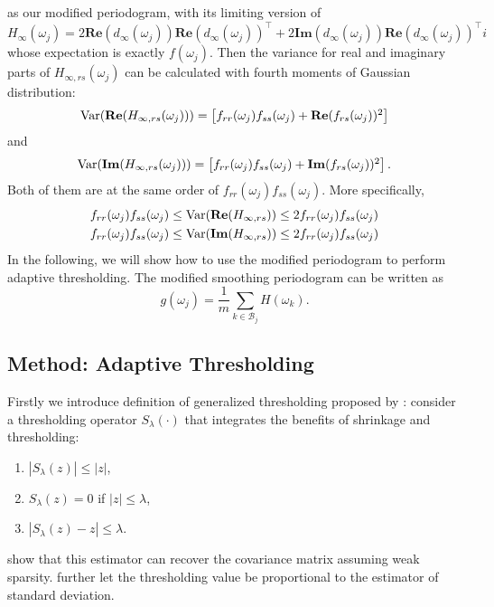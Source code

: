 as our modified periodogram, with its limiting version of
\begin{equation}
H_\infty(\omega_j) = 2\mathbf{Re}(d_{\infty}(\omega_j))  \mathbf{Re}(d_{\infty}(\omega_j))^\top+2\mathbf{Im}(d_{\infty}(\omega_j))  \mathbf{Re}(d_{\infty}(\omega_j))^\top i
\end{equation}
whose expectation is exactly $f(\omega_j)$. Then the variance for 
real and imaginary parts of $H_{\infty, rs}(\omega_j)$ can be calculated with fourth moments of Gaussian distribution: 
\begin{equation}
\begin{array}{cc}
\mathrm{Var}(\mathbf{Re}(H_{\infty, rs}(\omega_j))) = \left[f_{rr}(\omega_j)f_{ss}(\omega_j)+\mathbf{Re}(f_{rs}(\omega_j))^2\right]
\end{array}
\end{equation}
and 
\begin{equation}
\begin{array}{cc}
\mathrm{Var}(\mathbf{Im}(H_{\infty, rs}(\omega_j))) = \left[f_{rr}(\omega_j)f_{ss}(\omega_j)+\mathbf{Im}(f_{rs}(\omega_j))^2\right].
\end{array}
\end{equation}
Both of them are at the same order of $f_{rr}(\omega_j)f_{ss}(\omega_j)$. More specifically,
\begin{equation}
\begin{aligned}
& f_{rr}(\omega_j)f_{ss}(\omega_j)\le \mathrm{Var}({\bf Re}(H_{\infty, rs}))\le 2f_{rr}(\omega_j)f_{ss}(\omega_j) \\
& f_{rr}(\omega_j)f_{ss}(\omega_j)\le \mathrm{Var}({\bf Im}(H_{\infty, rs}))\le 2f_{rr}(\omega_j)f_{ss}(\omega_j)
\end{aligned}
\end{equation}
In the following, we will show how to use the modified periodogram to perform adaptive thresholding. The modified smoothing periodogram can be written as 
\begin{equation}
g(\omega_j) = \frac{1}{m}\sum_{k\in \mathcal{B}_j} H(\omega_k). 
\end{equation}



\subsection{Method: Adaptive Thresholding}
Firstly we introduce definition of generalized thresholding proposed by \cite{rothman2009generalized}: consider a thresholding operator $S_\lambda(\cdot)$ that integrates the benefits of shrinkage and thresholding: 
\begin{enumerate}[(1)]
\item $|S_\lambda(z)|\le |z|$,
\item $S_\lambda(z) = 0$ if $|z|\le \lambda$,
\item $|S_\lambda(z)-z|\le \lambda $.
\end{enumerate}
\cite{rothman2009generalized} show that this estimator can recover the covariance matrix assuming weak sparsity. \cite{cai2011adaptive} further let the thresholding value be proportional to the estimator of standard deviation. 


